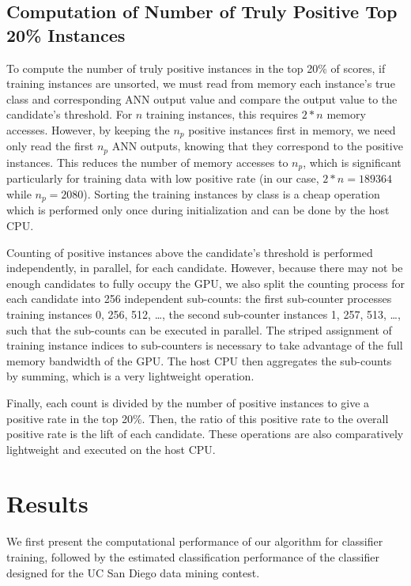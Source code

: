 \documentclass[letterpaper]{jpconf}       %
\begin{document}
\subsection{Computation of Number of Truly Positive Top 20\% Instances} \label{truepos}
To compute the number of truly positive instances in the top 20\% of scores, if training instances are unsorted, we must read from memory each instance's true class and corresponding ANN output value and compare the output value to the candidate's threshold. For $n$ training instances, this requires $2 * n$ memory accesses. However, by keeping the $n_p$ positive instances first in memory, we need only read the first $n_p$ ANN outputs, knowing that they correspond to the positive instances. This reduces the number of memory accesses to $n_p$, which is significant particularly for training data with low positive rate (in our case, $2 * n = 189364$ while $n_p = 2080$). Sorting the training instances by class is a cheap operation which is performed only once during initialization and can be done by the host CPU.

Counting of positive instances above the candidate's threshold is performed independently, in parallel, for each candidate. However, because there may not be enough candidates to fully occupy the GPU, we also split the counting process for each candidate into 256 independent sub-counts: the first sub-counter processes training instances 0, 256, 512, \ldots, the second sub-counter instances 1, 257, 513, \ldots, such that the sub-counts can be executed in parallel. The striped assignment of training instance indices to sub-counters is necessary to take advantage of the full memory bandwidth of the GPU. The host CPU then aggregates the sub-counts by summing, which is a very lightweight operation.

Finally, each count is divided by the number of positive instances to give a positive rate in the top 20\%. Then, the ratio of this positive rate to the overall positive rate is the lift of each candidate. These operations are also comparatively lightweight and executed on the host CPU.

\section{Results} \label{results}
We first present the computational performance of our algorithm for classifier training, followed by the estimated classification performance of the classifier designed for the UC San Diego data mining contest.
\end{document}

